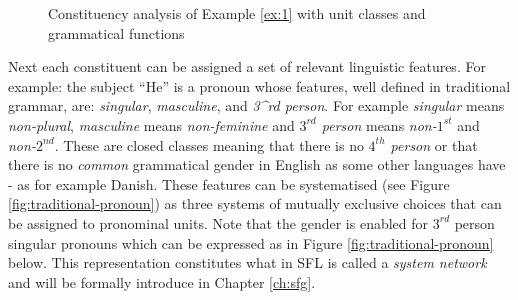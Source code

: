     \begin{figure}[!ht]
        \centering
        \caption{Constituency analysis of Example \ref{ex:1} with unit classes and grammatical functions}
        \label{fig:constit-classes-example}
    \end{figure}
    
    Next each constituent can be assigned a set of relevant linguistic features. For example: the subject ``He'' is a pronoun whose features, well defined in traditional grammar, are: \textit{singular}, \textit{masculine}, and \textit{3^{rd} person}. %
    For example \textit{singular} means \textit{non-plural}, \textit{masculine} means \textit{non-feminine} and \textit{$3^{rd}$ person} means \textit{non-$1^{st}$} and \textit{non-$2^{nd}$}. These are closed classes meaning that there is no \textit{$4^{th}$ person} or that there is no \textit{common} grammatical gender in English as some other languages have - as for example Danish. These features can be systematised (see Figure \ref{fig:traditional-pronoun}) as three systems of mutually exclusive choices that can be assigned to pronominal units. Note that the gender is enabled for $3^{rd}$ person singular pronouns which can be expressed as in Figure \ref{fig:traditional-pronoun} below. This representation constitutes what in SFL is called a \textit{system network} and will be formally introduce in Chapter \ref{ch:sfg}.
    
